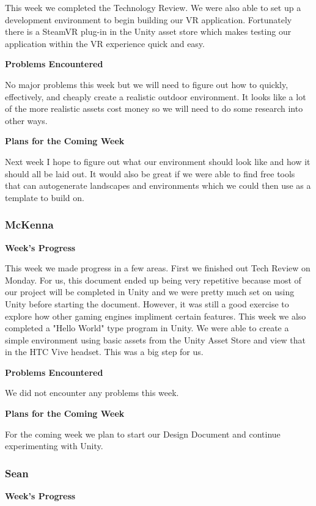 \documentclass[10pt,journal,compsoc,onecolumn, draftclsnofoot]{IEEEtran}
\begin{document}
This week we completed the Technology Review. We were also able to set up a development environment to begin building our VR application. Fortunately there is a SteamVR plug-in in the Unity asset store which makes testing our application within the VR experience quick and easy.

\noindent \textbf{Problems Encountered}

No major problems this week but we will need to figure out how to quickly, effectively, and cheaply create a realistic outdoor environment. It looks like a lot of the more realistic assets cost money so we will need to do some research into other ways.

\noindent \textbf{Plans for the Coming Week}

Next week I hope to figure out what our environment should look like and how it should all be laid out. It would also be great if we were able to find free tools that can autogenerate landscapes and environments which we could then use as a template to build on.

\subsubsection{McKenna}
\noindent \textbf{Week's Progress}

This week we made progress in a few areas. First we finished out Tech Review on Monday. For us, this document ended up being very repetitive because most of our project will be completed in Unity and we were pretty much set on using Unity before starting the document. However, it was still a good exercise to explore how other gaming engines impliment certain features. This week we also completed a "Hello World" type program in Unity. We were able to create a simple environment using basic assets from the Unity Asset Store and view that in the HTC Vive headset. This was a big step for us.

\noindent \textbf{Problems Encountered}

We did not encounter any problems this week.

\noindent \textbf{Plans for the Coming Week}

For the coming week we plan to start our Design Document and continue experimenting with Unity.

\subsubsection{Sean}
\noindent \textbf{Week's Progress}
\end{document}
